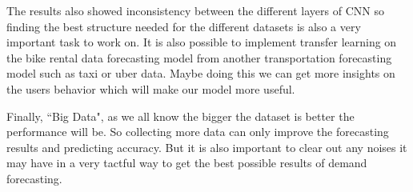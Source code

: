 The results also showed inconsistency between the different layers of CNN so finding the best structure needed for the different datasets is also a very important task to work on. It is also possible to implement transfer learning on the bike rental data forecasting model from another transportation forecasting model such as taxi or uber data. Maybe doing this we can get more insights on the users behavior which will make our model more useful. 

Finally, ``Big Data", as we all know the bigger the dataset is better the performance will be. So collecting more data can only improve the forecasting results and predicting accuracy. But it is also important to clear out any noises it may have in a very tactful way to get the best possible results of demand forecasting. 











